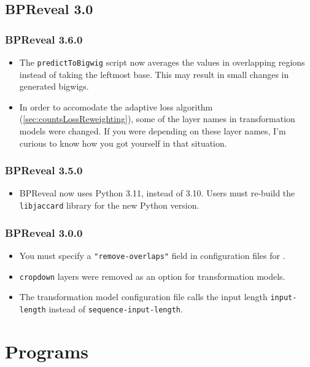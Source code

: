 \documentclass{article}
\begin{document}
\subsection{BPReveal 3.0}

\subsubsection{BPReveal 3.6.0}
\begin{itemize}
    \item The \texttt{predictToBigwig} script now averages the values in overlapping regions
        instead of taking the leftmost base. This may result in small changes in generated
        bigwigs.
    \item In order to accomodate the adaptive loss algorithm (\ref{sec:countsLossReweighting}),
        some of the layer names in transformation models were changed. If you were depending
        on these layer names, I'm curious to know how you got yourself in that situation.
\end{itemize}

\subsubsection{BPReveal 3.5.0}
\begin{itemize}
    \item BPReveal now uses Python 3.11, instead of 3.10. Users must re-build the
        \texttt{libjaccard} library for the new Python version.
\end{itemize}

\subsubsection{BPReveal 3.0.0}
\begin{itemize}
    \item You must specify a \texttt{"remove-overlaps"} field in configuration files for
        .
    \item \texttt{cropdown} layers were removed as an option for transformation models.
    \item \begin{sloppypar}The transformation model configuration file calls the input length
    \texttt{input-length} instead of \texttt{sequence-input-length}.\end{sloppypar}
\end{itemize}


\section{Programs}
\end{document}

